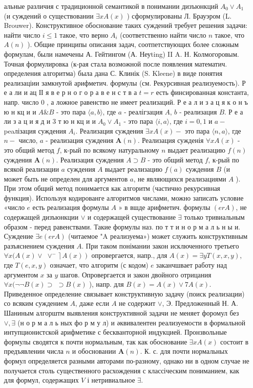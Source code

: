 \documentclass[10pt]{article}
\begin{document}
альные различия с традиционной семантикой в понимании дизъюнкций $A_{0} \vee A_{1}$ (и суждений о существовании $\exists x A(x)$ ) сформулированы Л. Брауэром (L. Brouwer). Конструктивное обоснование таких суждений требует решения задачи: найти число $i \leqslant 1$ такое, что верно $A_{i}$ (соответственно найти число $n$ такое, что $A(n)$ ). Общие принципы описания задач, соотпетствующих более сложным формулам, были намечены А. Гейтингом (А. Неуting) II A. Н. Колмогоровым. Точная формулировка (к-рая стала возможной после появления математич. определения алгоритма) была дана С. Клинік (S. Kleene) в виде понятия реализаціии замкнутой арифметич. формулы (см. Рекурсивная реализуемость). Р е а ли и ац ІІ я в е р н о г о р а в е н с т в а $t=r$ есть финсированная константа, напр. число 0 , а ложное равенство не имеет реализаций. Р е а л и з а ц я к о н ъ ю н кц и и $A \& B$ - это пара $\langle a, b\rangle$, где $a$ - реалігзация $A$, $b$ - реализация $B$. Р е а ли з а ц и я д и 3 т ю н кц и и $A_{0} \vee A_{1}$ - это пара $\langle i, a\rangle$, где $i=0,1$ и $a-$ peaлізация суждения $A_{i}$. Реализация суждения $\exists x A(x)-$ это пара $\langle n, a\rangle$, где $n-$ число, $a$ - реализация суждения $\boldsymbol{A}(n)$. Реализация сужденія $\forall x A(x)$ - это общий метод $f$, к-рый по всякому натуральному $n$ выдает реализацию $f(n)$ суждения $\boldsymbol{A}(n)$. Реализация суждения $A \supset B$ - это общий метод $f$, к-рый по всякой реализации $a$ суждения $A$ выдает реализацию $f(a)$ суждения $B$ (и может быть не определен для аргументов $a$, не являющихся реализациями $A$ ). При этом общий метод понимается как алгоритм (частично рекурсивная функция). Используя кодированге алгоритмов числами, можно записать условие «число $e$ есть реализация формулы $A$ » в вшде арифметич. формулы $(e r A)$, не содержащей дизъюнкции $\vee$ и содержащей существование $\exists$ только тривиальным образом - перед равенствами. Такие формулы наз. по т т и н о р м а л ь н ы и. Суждение $\exists e(e r A)$ (читаемое "A реализуема») может служить конструктивным разъяснением суждения $A$. При таком понімании закон исключенного третьего $\forall x(A(x) \vee$ $\left.\left.\vee^{-}\right\rceil A(x)\right)$ опровергается, напр., для $A(x)=\exists y T(x, x, y)$, где $T(e, x, y)$ означает, что алгоритм (с кодом) $e$ заканчшвает работу над аргументом $x$ за $y$ шагов. Опровергается и закон двойного отрицания $\forall x(\neg \neg B(x) \supset$ $\supset B(x)$ ), напр. для $B(x)=A(x) \vee 7 A(x)$. Приведенное определение связывает конструктивную задачу (поиск реализации) со всяким суждением $A$, даже если $A$ не содержит $\vee$, Э. Предложенный Н. А. Шаниным алгорштм выявления конструктивной задачи не меняет форомул без $\vee, \exists$ (н о р м а л ь ных фо р м у л) и әквивалентен реализуемости в формальной интупционистской арифметике с бескванторной индукцией. Пронзвольные формулы сводятся к почти нормальным, так как обоснование $\exists x A(x)$ состоит в предъявлении числа $n$ и обосновании $\boldsymbol{A}(n)$. К. с. для почти нормальных формул определяется разными авторами по-разному, однако ни в одном случае не получается столь существенного расхождения с классіческим пониманием, как для формул, содержащих $V$ і нетривиальное $\exists$.
\end{document}
